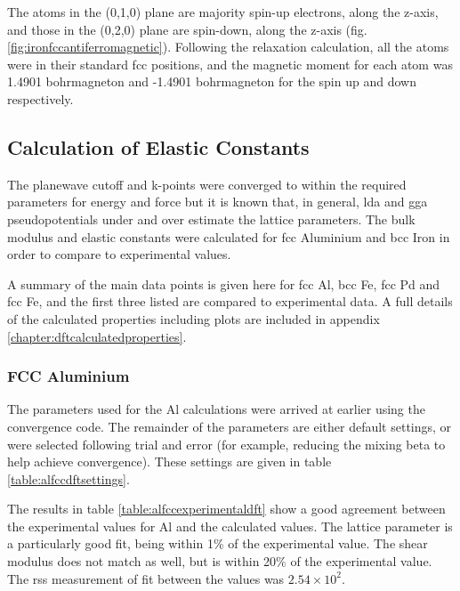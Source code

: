The atoms in the (0,1,0) plane are majority spin-up electrons, along the z-axis, and those in the (0,2,0) plane are spin-down, along the z-axis (fig. \ref{fig:ironfccantiferromagnetic}).  Following the relaxation calculation, all the atoms were in their standard \acrshort{fcc} positions, and the magnetic moment for each atom was 1.4901 \gls{bohrmagneton} and -1.4901 \gls{bohrmagneton} for the spin up and down respectively.  





\FloatBarrier
\subsection[Elastic Constants]{Calculation of Elastic Constants}
\label{section:resultselastic}

The planewave cutoff and k-points were converged to within the required parameters for energy and force but it is known that, in general, \acrshort{lda} and \acrshort{gga} pseudopotentials under and over estimate the lattice parameters.  The bulk modulus and elastic constants were calculated for \acrshort{fcc} Aluminium and \acrshort{bcc} Iron in order to compare to experimental values.

A summary of the main data points is given here for \acrshort{fcc} Al, \acrshort{bcc} Fe, \acrshort{fcc} Pd and \acrshort{fcc} Fe, and the first three listed are compared to experimental data.  A full details of the calculated properties including plots are included in appendix \ref{chapter:dftcalculatedproperties}.

\subsubsection{FCC Aluminium}

The parameters used for the Al calculations were arrived at earlier using the convergence code.  The remainder of the parameters are either default settings, or were selected following trial and error (for example, reducing the mixing beta to help achieve convergence).  These settings are given in table \ref{table:alfccdftsettings}.

The results in table \ref{table:alfccexperimentaldft} show a good agreement between the experimental values for Al and the calculated values.  The lattice parameter is a particularly good fit, being within 1\% of the experimental value.  The shear modulus does not match as well, but is within 20\% of the experimental value.  The \acrshort{rss} measurement of fit between the values was $2.54 \times 10^2$.


